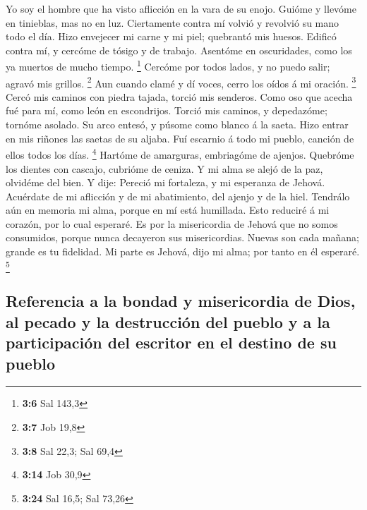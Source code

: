  Yo soy el hombre que ha visto aflicción en la vara de su
enojo.  Guióme y llevóme en tinieblas, mas no en luz.
 Ciertamente contra mí volvió y revolvió su mano todo el
día.  Hizo envejecer mi carne y mi piel; quebrantó mis
huesos.  Edificó contra mí, y cercóme de tósigo y de
trabajo.  Asentóme en oscuridades, como los ya muertos de
mucho tiempo. \footnote{\textbf{3:6} Sal 143,3}  Cercóme
por todos lados, y no puedo salir; agravó mis grillos. \footnote{\textbf{3:7}
  Job 19,8}  Aun cuando clamé y dí voces, cerro los oídos
á mi oración. \footnote{\textbf{3:8} Sal 22,3; Sal 69,4} 
Cercó mis caminos con piedra tajada, torció mis senderos.
 Como oso que acecha fué para mí, como león en
escondrijos.  Torció mis caminos, y depedazóme; tornóme
asolado.  Su arco entesó, y púsome como blanco á la
saeta.  Hizo entrar en mis riñones las saetas de su
aljaba.  Fuí escarnio á todo mi pueblo, canción de ellos
todos los días. \footnote{\textbf{3:14} Job 30,9} 
Hartóme de amarguras, embriagóme de ajenjos.  Quebróme
los dientes con cascajo, cubrióme de ceniza.  Y mi alma
se alejó de la paz, olvidéme del bien.  Y dije: Pereció
mi fortaleza, y mi esperanza de Jehová.  Acuérdate de mi
aflicción y de mi abatimiento, del ajenjo y de la hiel. 
Tendrálo aún en memoria mi alma, porque en mí está humillada.
 Esto reduciré á mi corazón, por lo cual esperaré.
 Es por la misericordia de Jehová que no somos
consumidos, porque nunca decayeron sus misericordias. 
Nuevas son cada mañana; grande es tu fidelidad.  Mi parte
es Jehová, dijo mi alma; por tanto en él esperaré. \footnote{\textbf{3:24}
  Sal 16,5; Sal 73,26}

\hypertarget{referencia-a-la-bondad-y-misericordia-de-dios-al-pecado-y-la-destrucciuxf3n-del-pueblo-y-a-la-participaciuxf3n-del-escritor-en-el-destino-de-su-pueblo}{%
\subsection{Referencia a la bondad y misericordia de Dios, al pecado y
la destrucción del pueblo y a la participación del escritor en el
destino de su
pueblo}\label{referencia-a-la-bondad-y-misericordia-de-dios-al-pecado-y-la-destrucciuxf3n-del-pueblo-y-a-la-participaciuxf3n-del-escritor-en-el-destino-de-su-pueblo}}

